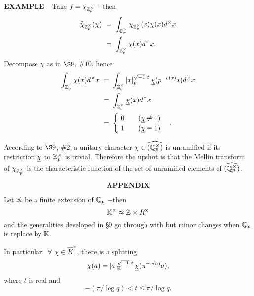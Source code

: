 \begin{x}{\small\bf EXAMPLE} \ %
Take $f = \chi_{\mathbb{Z}_p^\times}$ $-$then
\begin{align*}
\widetilde{\chi}_{\Z_p^\times} (\chi) \ 
&= \  \int_{\Q_p^\times} \chi_{\Z_p^\times} (x) \chi(x) d^\times x \\
&= \ \int_{\Z_p^\times} \chi(x) d^\times x.
\end{align*}
Decompose $\chi$ as in $\S 9$, $\# 10$, hence
\begin{align*}
\int_{\Z_p^\times} \chi(x) d^\times x \ 
&=\  \int_{\Z_p^\times} \abs{x}_p^{\sqrt{-1}\ t} \un{\chi}(p^{-v(x)}x) d^\times x\\
&=\  \int_{\Z_p^\times}  \un{\chi}(x) d^\times x\\
&=\ 
\begin{cases}
 \ 0  \qquad (\un{\chi} \not\equiv 1)\\
\ 1  \qquad (\un{\chi} \equiv 1)
\end{cases}
.
\end{align*}



According to $\S 9$, $\# 2$, a unitary character $\chi \in \widehat{(\mathbb{Q}_p^\times)}$ is unramified if its restriction 
$\underline{\chi}$ to $\mathbb{Z}_p^\times$ is trivial.  
Therefore the upshot is that the Mellin transform of $\chi_{\mathbb{Z}_p^\times}$ 
is the characteristic function of the set of unramified elements of $\widehat{(\mathbb{Q}_p^\times)}$.
\end{x}

\vspace{0.1cm}




\[
\textbf{APPENDIX}
\]
\setcounter{theoremn}{0}





Let $\mathbb{K}$ be a finite extension of $\mathbb{Q}_p$ $-$then
\[
\mathbb{K}^\times \thickapprox \mathbb{Z} \times R^\times
\]
and the generalities developed in \S9 go through with but minor changes when $\mathbb{Q}_p$ is replace by $\mathbb{K}$.

In particular$:$ $\forall$ $\chi \in \widehat{K}^\times$, there is a splitting
\[
\chi(a) = \left\vert a\right\vert_{\mathbb{K}}^{\sqrt{-1}\  t} \underline{\chi}(\pi^{-v(a)}a),
\]
where $t$ is real and 
\[
-(\pi/\log q) < t \le \pi / \log q.
\]

